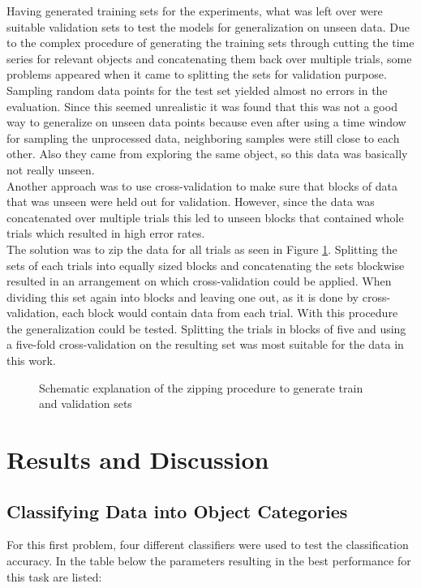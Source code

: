 Having generated training sets for the experiments, what was left over were suitable validation sets to test the models for generalization on unseen data. Due to the complex procedure of generating the training sets through cutting the time series for relevant objects and concatenating them back over multiple trials, some problems appeared when it came to splitting the sets for validation purpose.\\ Sampling random data points for the test set yielded almost no errors in the evaluation. Since this seemed unrealistic it was found that this was not a good way to generalize on unseen data points because even after using a time window for sampling the unprocessed data, neighboring samples were still close to each other. Also they came from exploring the same object, so this data was basically not really unseen.\\
Another approach was to use cross-validation to make sure that blocks of data that was unseen were held out for validation. However, since the data was concatenated over multiple trials this led to unseen blocks that contained whole trials which resulted in high error rates. \\
The solution was to zip the data for all trials as seen in Figure \ref{zip}. Splitting the sets of each trials into equally sized blocks and concatenating the sets blockwise resulted in an arrangement on which cross-validation could be applied. When dividing this set again into blocks and leaving one out, as it is done by cross-validation, each block would contain data from each trial. With this procedure the generalization could be tested. Splitting the trials in blocks of five and using a five-fold cross-validation on the resulting set was most suitable for the data in this work.

\begin{figure}[h]
	\caption{Schematic explanation of the zipping procedure to generate train and validation sets}
	\label{zip}
\end{figure}
\section{Results and Discussion} \label{results}
\subsection{Classifying Data into Object Categories}\label{e2}
For this first problem, four different classifiers were used to test the classification accuracy. In the table below the parameters resulting in the best performance for this task are listed:

